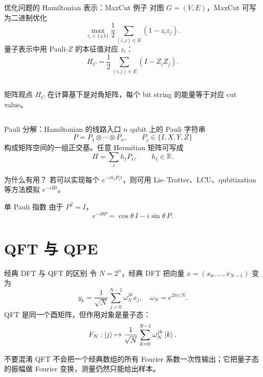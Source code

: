 \documentclass[aspectratio=169,10pt]{ctexbeamer}
\begin{document}
\begin{frame}{优化问题的 Hamiltonian 表示：MaxCut 例子}
对图 $G=(V,E)$，MaxCut 可写为二进制优化
\[
\max_{z_i\in\{\pm1\}}\frac12\sum_{(i,j)\in E}(1-z_iz_j).
\]
量子表示中用 Pauli-$Z$ 的本征值对应 $z_i$：
\[
H_C=\frac12\sum_{(i,j)\in E}(I-Z_iZ_j).
\]
\begin{columns}[T,totalwidth=\textwidth]
\begin{keybox}{矩阵观点}
$H_C$ 在计算基下是对角矩阵，每个 bit string 的能量等于对应 cut value。
\end{keybox}
\end{columns}
\end{frame}

\begin{frame}{Pauli 分解：Hamiltonian 的线路入口}
$n$ qubit 上的 Pauli 字符串
\[
P=P_1\otimes\cdots\otimes P_n,
\qquad P_j\in\{I,X,Y,Z\}
\]
构成矩阵空间的一组正交基。任意 Hermitian 矩阵可写成
\[
H=\sum_{\ell} h_{\ell}P_{\ell},\qquad h_{\ell}\in\mathbb R.
\]
\begin{keybox}{为什么有用？}
若可以实现每个 $e^{-ih_{\ell}P_{\ell}t}$，则可用 Lie--Trotter、LCU、qubitization 等方法模拟 $e^{-iHt}$。
\end{keybox}
\begin{exbox}{单 Pauli 指数}
由于 $P^2=I$，
\[
e^{-i\theta P}=\cos\theta\,I-i\sin\theta\,P.
\]
\end{exbox}
\end{frame}

\section{QFT 与 QPE}

\begin{frame}{经典 DFT 与 QFT 的区别}
令 $N=2^n$，经典 DFT 把向量 $x=(x_0,\ldots,x_{N-1})$ 变为
\[
y_k=\frac1{\sqrt N}\sum_{j=0}^{N-1}\omega_N^{jk}x_j,
\quad \omega_N=e^{2\pi i/N}.
\]
QFT 是同一个酉矩阵，但作用对象是量子态：
\[
F_N:\ket{j}\mapsto \frac1{\sqrt N}\sum_{k=0}^{N-1}\omega_N^{jk}\ket{k}.
\]
\begin{warnbox}{不要混淆}
QFT 不会把一个经典数组的所有 Fourier 系数一次性输出；它把量子态的振幅做 Fourier 变换，测量仍然只能给出样本。
\end{warnbox}
\end{frame}
\end{document}
